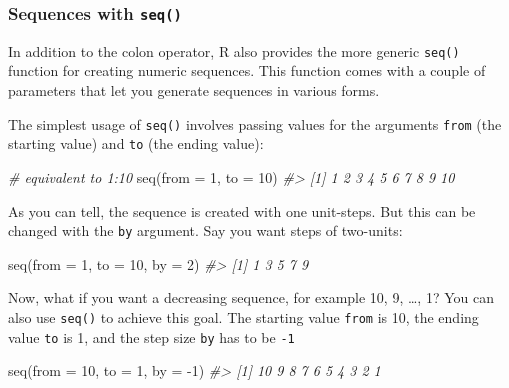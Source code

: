 \documentclass[
]{book}
\newenvironment{Shaded}{\begin{snugshade}}{\end{snugshade}}
\newcommand{\AttributeTok}[1]{\textcolor[rgb]{0.77,0.63,0.00}{#1}}
\newcommand{\CommentTok}[1]{\textcolor[rgb]{0.56,0.35,0.01}{\textit{#1}}}
\newcommand{\DecValTok}[1]{\textcolor[rgb]{0.00,0.00,0.81}{#1}}
\newcommand{\FunctionTok}[1]{\textcolor[rgb]{0.00,0.00,0.00}{#1}}
\newcommand{\NormalTok}[1]{#1}
\newcommand{\SpecialCharTok}[1]{\textcolor[rgb]{0.00,0.00,0.00}{#1}}
\begin{document}
\hypertarget{sequences-with-seq}{%
\subsubsection*{\texorpdfstring{Sequences with \texttt{seq()}}{Sequences with seq()}}\label{sequences-with-seq}}

In addition to the colon operator, R also provides the more generic \texttt{seq()}
function for creating numeric sequences. This function comes with a couple of
parameters that let you generate sequences in various forms.

The simplest usage of \texttt{seq()} involves passing values for the arguments \texttt{from}
(the starting value) and \texttt{to} (the ending value):

\begin{Shaded}
\begin{Highlighting}[]
\CommentTok{\# equivalent to 1:10}
\FunctionTok{seq}\NormalTok{(}\AttributeTok{from =} \DecValTok{1}\NormalTok{, }\AttributeTok{to =} \DecValTok{10}\NormalTok{)}
\CommentTok{\#\textgreater{}  [1]  1  2  3  4  5  6  7  8  9 10}
\end{Highlighting}
\end{Shaded}

As you can tell, the sequence is created with one unit-steps. But this can
be changed with the \texttt{by} argument. Say you want steps of two-units:

\begin{Shaded}
\begin{Highlighting}[]
\FunctionTok{seq}\NormalTok{(}\AttributeTok{from =} \DecValTok{1}\NormalTok{, }\AttributeTok{to =} \DecValTok{10}\NormalTok{, }\AttributeTok{by =} \DecValTok{2}\NormalTok{)}
\CommentTok{\#\textgreater{} [1] 1 3 5 7 9}
\end{Highlighting}
\end{Shaded}

Now, what if you want a decreasing sequence, for example 10, 9, \ldots, 1?
You can also use \texttt{seq()} to achieve this goal. The starting value \texttt{from} is 10,
the ending value \texttt{to} is 1, and the step size \texttt{by} has to be \texttt{-1}

\begin{Shaded}
\begin{Highlighting}[]
\FunctionTok{seq}\NormalTok{(}\AttributeTok{from =} \DecValTok{10}\NormalTok{, }\AttributeTok{to =} \DecValTok{1}\NormalTok{, }\AttributeTok{by =} \SpecialCharTok{{-}}\DecValTok{1}\NormalTok{)}
\CommentTok{\#\textgreater{}  [1] 10  9  8  7  6  5  4  3  2  1}
\end{Highlighting}
\end{Shaded}
\end{document}
